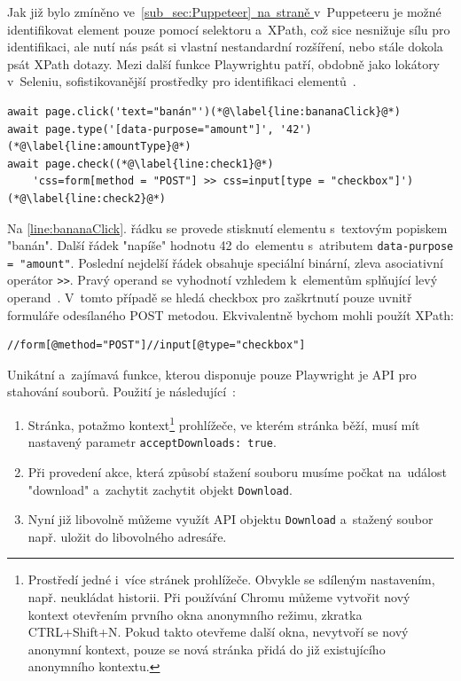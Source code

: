 \documentclass[12pt, a4paper, twoside]{article}
\newcommand{\codefigureSpacing}{1.2}
\newcommand{\refAddedText}[3]{\hyperref[#1]{#2\ref{#1}#3}}
\newcommand{\lineref}[2]{\refAddedText{#1}{}{.~#2}}
\newcommand*{\partialref}[2]{\hyperref[{#1}]{\ref{#2}~na~straně \pageref{#1}}}
\begin{document}
	Jak již bylo zmíněno ve~\partialref{text:puppeteerLocatorSupport}{sub_sec:Puppeteer} v~Puppeteeru je možné identifikovat element pouze pomocí selektoru a~XPath, což sice nesnižuje sílu pro identifikaci, ale nutí nás psát si vlastní nestandardní rozšíření, nebo stále dokola psát XPath dotazy. Mezi další funkce Playwrightu patří, obdobně jako lokátory v~Seleniu, sofistikovanější prostředky pro identifikaci elementů~\cite{playwrightApi}. 
	\begin{codefigure}[H]
		\renewcommand\baselinestretch{\codefigureSpacing}
		\begin{lstlisting}[style=MyJavaScript]
await page.click('text="banán"')(*@\label{line:bananaClick}@*)
await page.type('[data-purpose="amount"]', '42')(*@\label{line:amountType}@*)
await page.check((*@\label{line:check1}@*)
	'css=form[method = "POST"] >> css=input[type = "checkbox"]')(*@\label{line:check2}@*)
		\end{lstlisting}
		\caption{Akce se specificky identifikovanými elementy}
	\end{codefigure}
	Na \ref{line:bananaClick}. řádku se provede stisknutí elementu s~textovým popiskem "banán". Další řádek "napíše" hodnotu 42 do~elementu s~atributem \foreignlanguage{english}{\texttt{data-purpose = "amount"}}. Poslední nejdelší řádek obsahuje speciální binární, zleva asociativní operátor \texttt{>>}. Pravý operand se vyhodnotí vzhledem k~elementům splňující levý operand~\cite{playwrightApi}. V~tomto případě se hledá checkbox pro zaškrtnutí pouze uvnitř formuláře odesílaného POST metodou. Ekvivalentně bychom mohli použít XPath:
	\begin{codefigure}[H]
		\renewcommand\baselinestretch{\codefigureSpacing}
		\begin{lstlisting}[style=MyXPath]
//form[@method="POST"]//input[@type="checkbox"]
		\end{lstlisting}
	\caption{XPath ekvivalentní identifikátoru elementu na~\lineref{line:check2}{řádku}}
	\end{codefigure}
	
	Unikátní a~zajímavá funkce, kterou disponuje pouze Playwright je API pro stahování souborů. Použití je následující~\cite{playwrightApi}: 
	\begin{enumerate}
		\item Stránka, potažmo kontext\footnote{Prostředí jedné i~více stránek prohlížeče. Obvykle se sdíleným nastavením, např. neukládat historii. Při používání Chromu můžeme vytvořit nový kontext otevřením prvního okna anonymního režimu, zkratka CTRL+Shift+N. Pokud takto otevřeme další okna, nevytvoří se nový anonymní kontext, pouze se nová stránka přidá do již existujícího anonymního kontextu.} prohlížeče, ve kterém stránka běží, musí mít nastavený parametr \texttt{acceptDownloads: true}.
		\item Při provedení akce, která způsobí stažení souboru musíme počkat na~událost "download" a~zachytit zachytit objekt \texttt{Download}. 
		\item Nyní již libovolně můžeme využít API objektu \texttt{Download} a~stažený soubor např. uložit do libovolného adresáře. 
	\end{enumerate}
\end{document}
